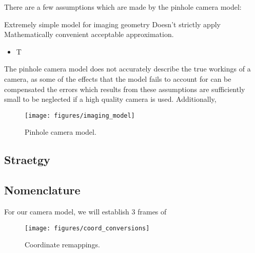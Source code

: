 There are a few assumptions which are made by the pinhole camera model:

Extremely simple model for imaging geometry
Doesn't strictly apply
Mathematically convenient acceptable approximation.
\begin{itemize}
    \item T
\end{itemize}

The pinhole camera model does not accurately describe the true workings of a camera, as some of the  effects that the model fails to account for can be compensated the errors which results from these assumptions are sufficiently small to be neglected if a high quality camera is used. Additionally,

\begin{figure}[H]
    \centering
    \texttt{[image: figures/imaging\_model]}
    \caption{Pinhole camera model.}
\end{figure}

\subsection{Straetgy}

\subsection{Nomenclature}


For our camera model, we will establish 3 frames of


\begin{figure}[H]
    \centering
    \texttt{[image: figures/coord\_conversions]}
    \caption{Coordinate remappings.}
\end{figure}



